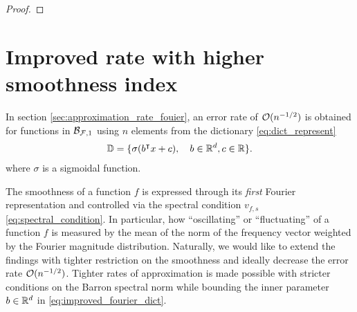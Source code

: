 \begin{proof}


\end{proof}

\section{Improved rate with higher smoothness index}

In section \ref{sec:approximation_rate_fouier}, an error rate of
$\mathcal{O}(n^{-1/2})$ is obtained for functions in $\mathcal{B}_{\mathcal{F}, 1}$ using $n$
elements from the dictionary
\eqref{eq:dict_represent}
\begin{align}
    \label{eq:improved_fourier_dict}
    \mathbb{D} = \{
        \sigma(b{}^{\intercal} x + c), \quad b\in\mathbb{R}^d, c\in\mathbb{R}
    \}.
\end{align}
where $\sigma$ is a sigmoidal function.

The smoothness of a function $f$ is expressed through its \textit{first} Fourier
representation and controlled via the spectral condition $v_{f,s}$
\eqref{eq:spectral_condition}. In particular, how ``oscillating'' or
``fluctuating'' of a function $f$ is measured by the mean of the norm of the
frequency vector weighted by the Fourier magnitude distribution. Naturally, we
would like to extend the findings with tighter restriction on the smoothness and
ideally decrease the error rate $\mathcal{O}(n^{-1/2})$. Tighter rates of
approximation is made possible with stricter conditions on the Barron spectral
norm while bounding the inner parameter $b\in\mathbb{R}^d$ in
\eqref{eq:improved_fourier_dict}.

